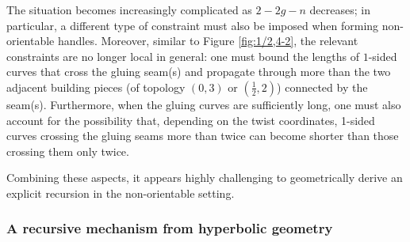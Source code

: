 \documentclass[12pt]{amsart}
\theoremstyle{plain}
\theoremstyle{definition}
\theoremstyle{remark}
\numberwithin{equation}{section}
\begin{document}
The situation becomes increasingly complicated as $2-2g-n$ decreases; in particular, a different type of constraint must also be imposed when forming non-orientable handles. Moreover, similar to Figure \ref{fig:1/2,4-2}, the relevant constraints are no longer local in general: one must bound the lengths of $1$-sided curves that cross the gluing seam(s) and propagate through more than the two adjacent building pieces (of topology $(0,3)$ or $(\frac12,2)$) connected by the seam(s). Furthermore, when the gluing curves are sufficiently long, one must also account for the possibility that, depending on the twist coordinates, 1-sided curves crossing the gluing seams more than twice can become shorter than those crossing them only twice.




Combining these aspects, it appears highly challenging to geometrically derive an explicit recursion in the non-orientable setting.

\subsubsection{A recursive mechanism from hyperbolic geometry} 

\end{document}
